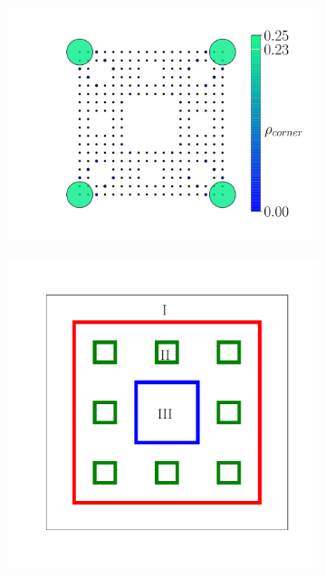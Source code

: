 \begin{figure}[h!]
\begin{subfigure}[b!]{0.24 \textwidth}
     \end{subfigure}\hspace*{-0.5em} 
      \begin{subfigure}[b!]{0.28 \textwidth}
         \caption{}
         \includegraphics[width=\textwidth]{Imagenes/Resultados_Hoti_Fractal/proyection_square.pdf}
     \end{subfigure}\hspace*{-0.5em} 
     \begin{subfigure}[b!]{0.24 \textwidth}
        \caption{}
        \includegraphics[width=\textwidth]{Imagenes/Models/sierpinski_carpet_color.pdf}

\end{subfigure}
\end{figure}
